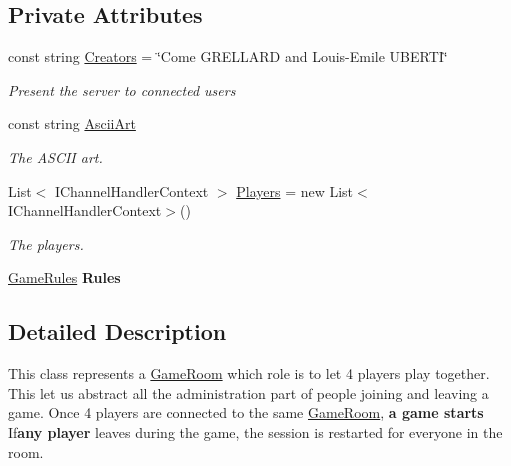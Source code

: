 \subsection*{Private Attributes}
\begin{DoxyCompactItemize}
\item 
const string \hyperlink{class_coinche_1_1_server_1_1_game_room_a4c8ca7fdee546c137ce5a62bc3812aab}{Creators} = \char`\"{}Come G\+R\+E\+L\+L\+A\+RD and Louis-\/Emile U\+B\+E\+R\+TI\char`\"{}
\begin{DoxyCompactList}\small\item\em Present the server to connected users \end{DoxyCompactList}\item 
const string \hyperlink{class_coinche_1_1_server_1_1_game_room_ae56bde4084308813042760d8d816d503}{Ascii\+Art}
\begin{DoxyCompactList}\small\item\em The A\+S\+C\+II art. \end{DoxyCompactList}\item 
List$<$ I\+Channel\+Handler\+Context $>$ \hyperlink{class_coinche_1_1_server_1_1_game_room_a6e3fede9179111fa2d6fdfed2edb0133}{Players} = new List$<$I\+Channel\+Handler\+Context$>$()
\begin{DoxyCompactList}\small\item\em The players. \end{DoxyCompactList}\item 
\mbox{\label{class_coinche_1_1_server_1_1_game_room_adb98ff4dd0ecd0272dd99444ad5ac522}} 
\hyperlink{class_coinche_1_1_game_rules}{Game\+Rules} {\bfseries Rules}
\end{DoxyCompactItemize}


\subsection{Detailed Description}
This class represents a \hyperlink{class_coinche_1_1_server_1_1_game_room}{Game\+Room} which role is to let 4 players play together. This let us abstract all the administration part of people joining and leaving a game. Once 4 players are connected to the same \hyperlink{class_coinche_1_1_server_1_1_game_room}{Game\+Room}, {\bfseries a game starts} If{\bfseries any player} leaves during the game, the session is restarted for everyone in the room. 



